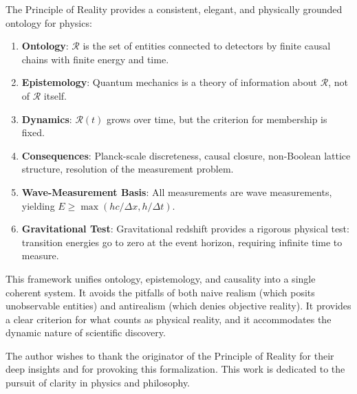 \documentclass[aps,preprint,showpacs,showkeys]{revtex4}%
\begin{document}
The Principle of Reality provides a consistent, elegant, and physically
grounded ontology for physics:

\begin{enumerate}
\item \textbf{Ontology}: $\mathcal{R}$ is the set of entities connected to
detectors by finite causal chains with finite energy and time.

\item \textbf{Epistemology}: Quantum mechanics is a theory of information
about $\mathcal{R}$, not of $\mathcal{R}$ itself.

\item \textbf{Dynamics}: $\mathcal{R}(t)$ grows over time, but the criterion
for membership is fixed.

\item \textbf{Consequences}: Planck-scale discreteness, causal closure,
non-Boolean lattice structure, resolution of the measurement problem.

\item \textbf{Wave-Measurement Basis}: All measurements are wave
measurements, yielding $E \ge \max(hc/\Delta x, h/\Delta t)$.

\item \textbf{Gravitational Test}: Gravitational redshift provides a
rigorous physical test: transition energies go to zero at the event horizon,
requiring infinite time to measure.
\end{enumerate}

This framework unifies ontology, epistemology, and causality into a single
coherent system. It avoids the pitfalls of both naive realism (which posits
unobservable entities) and antirealism (which denies objective reality). It
provides a clear criterion for what counts as physical reality, and it
accommodates the dynamic nature of scientific discovery.

\begin{acknowledgments}
The author wishes to thank the originator of the Principle of Reality for their deep insights and for provoking this formalization. This work is dedicated to the pursuit of clarity in physics and philosophy.
\end{acknowledgments}
\end{document}
